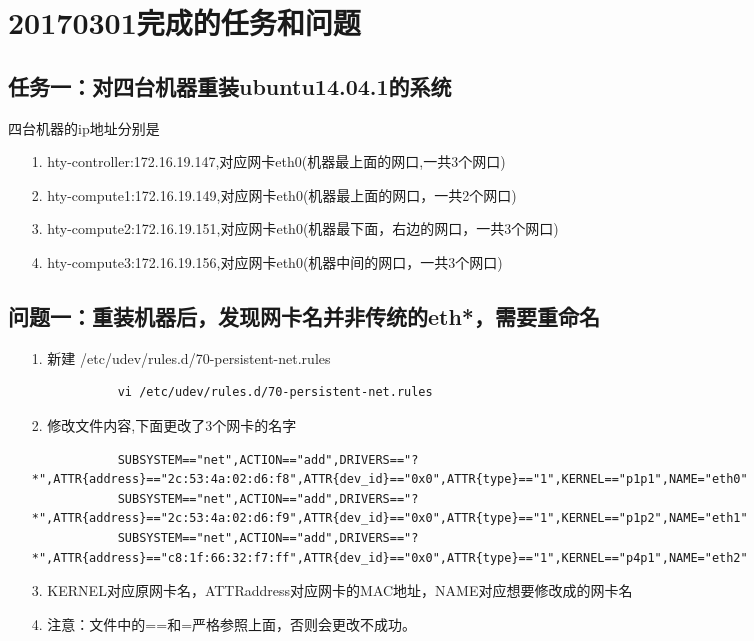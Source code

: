 \documentclass[a4paper,left=1.5cm,right=1.5cm,11pt]{article}
\begin{document}
\tableofcontents

\clearpage


\section{20170301完成的任务和问题}

\subsection{任务一：对四台机器重装ubuntu14.04.1的系统}
    四台机器的ip地址分别是\par
\begin{itemize}
	\item[1.]hty-controller:172.16.19.147,对应网卡eth0(机器最上面的网口,一共3个网口)
	\item[2.]hty-compute1:172.16.19.149,对应网卡eth0(机器最上面的网口，一共2个网口)
	\item[3.]hty-compute2:172.16.19.151,对应网卡eth0(机器最下面，右边的网口，一共3个网口)
	\item[4.]hty-compute3:172.16.19.156,对应网卡eth0(机器中间的网口，一共3个网口)
\end{itemize}

\subsection{问题一：重装机器后，发现网卡名并非传统的eth*，需要重命名}
\begin{itemize}
	\item[1.] 新建 /etc/udev/rules.d/70-persistent-net.rules
        \begin{lstlisting}
            vi /etc/udev/rules.d/70-persistent-net.rules
        \end{lstlisting}
	\item[2.] 修改文件内容,下面更改了3个网卡的名字
        \begin{lstlisting}
            SUBSYSTEM=="net",ACTION=="add",DRIVERS=="?*",ATTR{address}=="2c:53:4a:02:d6:f8",ATTR{dev_id}=="0x0",ATTR{type}=="1",KERNEL=="p1p1",NAME="eth0"
            SUBSYSTEM=="net",ACTION=="add",DRIVERS=="?*",ATTR{address}=="2c:53:4a:02:d6:f9",ATTR{dev_id}=="0x0",ATTR{type}=="1",KERNEL=="p1p2",NAME="eth1"
            SUBSYSTEM=="net",ACTION=="add",DRIVERS=="?*",ATTR{address}=="c8:1f:66:32:f7:ff",ATTR{dev_id}=="0x0",ATTR{type}=="1",KERNEL=="p4p1",NAME="eth2"
        \end{lstlisting}
	\item[3.]KERNEL对应原网卡名，ATTR{address}对应网卡的MAC地址，NAME对应想要修改成的网卡名
	\item[4.]注意：文件中的==和=严格参照上面，否则会更改不成功。
\end{itemize}
\end{document}
